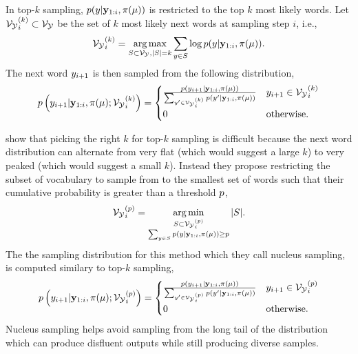 In top-$k$ sampling, $p(y|\mathbf{y}_{1:i},\pi(\mu))$ is 
restricted to the top $k$ most likely words. Let ${\mathcal{V}_{\mathcal{Y}}}_i^{(k)} \subset \mathcal{V}_{\mathcal{Y}}$ be 
the set of $k$ most likely next words at sampling step $i$, i.e.,
\[{\mathcal{V}_{\mathcal{Y}}}_i^{(k)} = \operatorname*{arg\,max}_{S \subset \mathcal{V}_{\mathcal{Y}}, {\left\vert S \right\vert} = k} \sum_{y \in S} \log p(y|\mathbf{y}_{1:i},\pi(\mu)). \]
The next word $y_{i+1}$ is then sampled from the following distribution,
\[
    p\left(y_{i+1}|\mathbf{y}_{1:i},\pi(\mu);{\mathcal{V}_{\mathcal{Y}}}_i^{(k)}\right)
    =
    \begin{cases} 
   \frac{
   p(y_{i+1}|\mathbf{y}_{1:i},\pi(\mu))
   }{ 
       \sum_{y^\prime \in {\mathcal{V}_{\ensuremath{\mathcal{Y}}}}_i^{(k)}}
   p(y^\prime|\mathbf{y}_{1:i},\pi(\mu))  
   }  & y_{i+1} \in {\mathcal{V}_{\ensuremath{\mathcal{Y}}}}_i^{(k)} \\ 
0 & \textrm{otherwise}. \end{cases} 
\]

\citet{nucleus} show that picking the right $k$ for top-$k$ sampling is 
difficult because the next word distribution can alternate from very flat 
(which would suggest a large $k$) to very peaked 
(which would suggest a small $k$).
Instead they propose restricting the subset of vocabulary to sample 
from to the smallest set of words such that their cumulative probability
is greater than a threshold $p$,
\[ {\mathcal{V}_{\mathcal{Y}}}_i^{(p)} = \operatorname*{arg\,min}_{\substack{S \subset {\mathcal{V}_{\ensuremath{\mathcal{Y}}}}_i^{(p)} \\ \sum_{y \in S} p(y|\mathbf{y}_{1:i},\pi(\mu)) \ge p  }} {\left\vert S \right\vert}. \] The the sampling distribution
for this method which they call nucleus sampling, is computed similary to top-$k$ sampling,
\[
p\left(y_{i+1}|\mathbf{y}_{1:i},\pi(\mu);  {\mathcal{V}_{\mathcal{Y}}}_i^{(p)} \right)
    =
    \begin{cases} 
   \frac{
   p(y_{i+1}|\mathbf{y}_{1:i},\pi(\mu))
   }{ 
       \sum_{y^\prime \in {\mathcal{V}_{\ensuremath{\mathcal{Y}}}}_i^{(p)}}
   p(y^\prime|\mathbf{y}_{1:i},\pi(\mu))  
   }  & y_{i+1} \in {\mathcal{V}_{\ensuremath{\mathcal{Y}}}}_i^{(p)} \\ 
0 & \textrm{otherwise}. \end{cases} 
\]
Nucleus sampling helps avoid sampling from the long tail of the distribution
which can produce disfluent outputs while still producing diverse samples.






